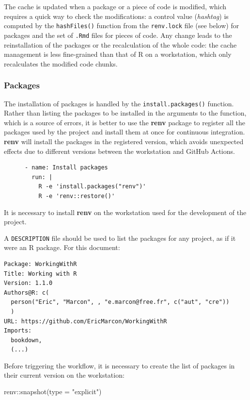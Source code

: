 \documentclass[
  12pt,
  american,
  a4paper,
  extrafontsizes,onecolumn,openright
  ]{memoir}
\newenvironment{Shaded}{\begin{snugshade}}{\end{snugshade}}
\newcommand{\AttributeTok}[1]{\textcolor[rgb]{0.77,0.63,0.00}{#1}}
\newcommand{\FunctionTok}[1]{\textcolor[rgb]{0.00,0.00,0.00}{#1}}
\newcommand{\NormalTok}[1]{#1}
\newcommand{\SpecialCharTok}[1]{\textcolor[rgb]{0.00,0.00,0.00}{#1}}
\newcommand{\StringTok}[1]{\textcolor[rgb]{0.31,0.60,0.02}{#1}}
\begin{document}
The cache is updated when a package or a piece of code is modified, which requires a quick way to check the modifications: a control value (\emph{hashtag}) is computed by the \texttt{hashFiles()} function from the \texttt{renv.lock} file (see below) for packages and the set of \texttt{.Rmd} files for pieces of code.
Any change leads to the reinstallation of the packages or the recalculation of the whole code: the cache management is less fine-grained than that of R on a workstation, which only recalculates the modified code chunks.

\hypertarget{sec:packages-ci}{%
\subsubsection{Packages}\label{sec:packages-ci}}

The installation of packages is handled by the \texttt{install.packages()} function.
Rather than listing the packages to be installed in the arguments to the function, which is a source of errors, it is better to use the \textbf{renv} package to register all the packages used by the project and install them at once for continuous integration.
\textbf{renv} will install the packages in the registered version, which avoids unexpected effects due to different versions between the workstation and GitHub Actions.

\begin{verbatim}
      - name: Install packages
        run: |
          R -e 'install.packages("renv")'
          R -e 'renv::restore()'
\end{verbatim}

It is necessary to install \textbf{renv} on the workstation used for the development of the project.

A \texttt{DESCRIPTION} file should be used to list the packages for any project, as if it were an R package.
For this document:

\begin{verbatim}
Package: WorkingWithR
Title: Working with R
Version: 1.1.0
Authors@R: c(
  person("Eric", "Marcon", , "e.marcon@free.fr", c("aut", "cre"))
  )
URL: https://github.com/EricMarcon/WorkingWithR
Imports:
  bookdown,
  (...)
\end{verbatim}

Before triggering the workflow, it is necessary to create the list of packages in their current version on the workstation:

\scriptsize

\begin{Shaded}
\begin{Highlighting}[]
\NormalTok{renv}\SpecialCharTok{::}\FunctionTok{snapshot}\NormalTok{(}\AttributeTok{type =} \StringTok{"explicit"}\NormalTok{)}
\end{Highlighting}
\end{Shaded}
\end{document}

